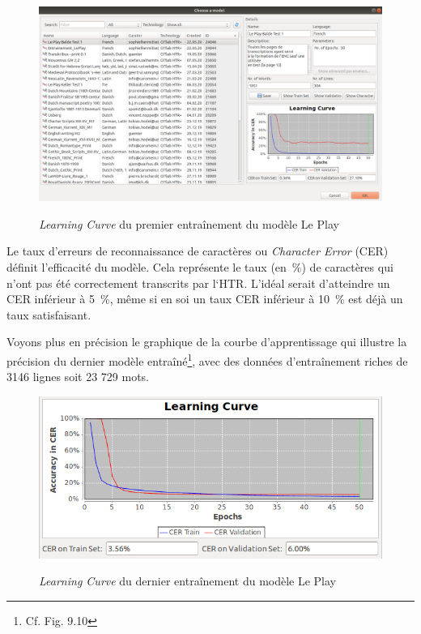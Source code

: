 \begin{figure}[ht]
    \centering
    \caption{\emph{Learning Curve} du premier entraînement du modèle Le Play}
    \includegraphics[width=16cm]{images/learningCurve.png}
    \label{learningCurve}
\end{figure}

Le taux d'erreurs de reconnaissance de caractères ou \emph{Character Error} (CER) définit l'efficacité du modèle. Cela représente le taux (en~\%) de caractères qui n'ont pas été
correctement transcrits par l‘HTR. L'idéal serait d'atteindre un CER inférieur à 5~\%, même si en soi un taux CER inférieur à 10~\% est déjà un taux satisfaisant.

Voyons plus en précision le graphique de la courbe d'apprentissage qui illustre la précision du dernier modèle entraîné\footnote{Cf. Fig. 9.10}, avec des données d'entraînement riches de 3146 lignes soit 23 729 mots.
 
 \begin{figure}[ht]
    \centering
    \caption{\emph{Learning Curve} du dernier entraînement du modèle Le Play}
    \includegraphics[width=16cm]{images/LearningCurveV4.png}
    \label{LearningCurveV4}
\end{figure}
 
